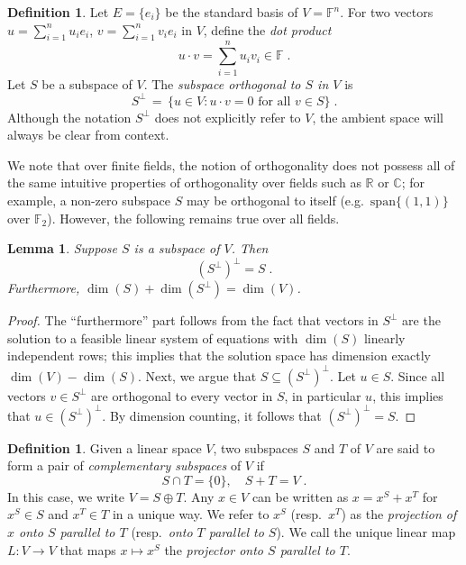 \documentclass[11pt]{article}
\newtheorem{lemma}[theorem]{Lemma}
\theoremstyle{definition}
\newtheorem{definition}[theorem]{Definition}
\newcommand{\C}{\ensuremath{\mathbb{C}}}
\newcommand{\F}{\ensuremath{\mathbb{F}}}
\newcommand{\R}{\ensuremath{\mathbb{R}}}
\begin{document}
\begin{definition}
  Let $E = \{ e_i\}$ be the standard basis of $V = \F^n$.
  For two vectors $u = \sum_{i=1}^n u_i e_i$, $v = \sum_{i=1}^n v_i e_i$ in $V$,
  define the \emph{dot product}
  \begin{equation*}
    u \cdot v = \sum_{i=1}^n u_i v_i \in \F\;.
  \end{equation*}
  Let $S$ be a subspace of $V$. The \emph{subspace orthogonal to $S$ in $V$} is
  \begin{equation*}
    S^\perp \,=\, \big\{ u \in V : u \cdot v = 0
    \text{ for all }  v \in S \big\}\;.
  \end{equation*}
  Although the notation $S^\perp$ does not explicitly refer to $V$, the ambient
  space will always be clear from context.
\end{definition}

We note that over finite fields, the notion of orthogonality does not possess
all of the same intuitive properties of orthogonality over fields such as $\R$
or $\C$; for example, a non-zero subspace $S$ may be orthogonal to itself (e.g.\
$\mathrm{span} \{ (1,1) \}$ over $\F_2$).
However, the following remains true over all fields.

\begin{lemma}
  \label{lem:perp_perp}
  Suppose $S$ is a subspace of $V$. Then
  \begin{equation*}
    (S^\perp)^\perp = S\;.
  \end{equation*}
  Furthermore, $\dim(S) + \dim(S^\perp) = \dim(V)$.
\end{lemma}

\begin{proof}
  The ``furthermore'' part follows from the fact that vectors in $S^\perp$ are
  the solution to a feasible linear system of equations with $\dim(S)$ linearly
  independent rows; this implies that the solution space has dimension exactly
  $\dim(V) - \dim(S)$.
  Next, we argue that $S \subseteq (S^\perp)^\perp$.
  Let $u \in S$.
  Since all vectors $v \in S^\perp$ are orthogonal to every vector in $S$,
  in particular $u$, this implies that $u \in (S^\perp)^\perp$.
  By dimension counting, it follows that $(S^\perp)^\perp = S$.
\end{proof}

\begin{definition}\label{def:complementary}
  Given a linear space $V$, two subspaces $S$ and $T$ of $V$ are said to form a
  pair of \emph{complementary subspaces} of $V$ if
\begin{equation*}
  S \cap T = \{ 0 \}, \quad S + T = V\;.
\end{equation*}
In this case, we write $V = S \oplus T$.
Any $x\in V$ can be written as $x = x^S + x^T$ for $x^S \in S$ and $x^T \in T$
in a unique way.
We refer to $x^S$ (resp.~$x^T$) as the \emph{projection of $x$ onto $S$ parallel
  to $T$} (resp.~\emph{onto $T$ parallel to $S$}).
We call the unique linear map $L: V \to V$ that maps $x \mapsto x^S$ the
\emph{projector onto $S$ parallel to $T$}.
\end{definition}
\end{document}
